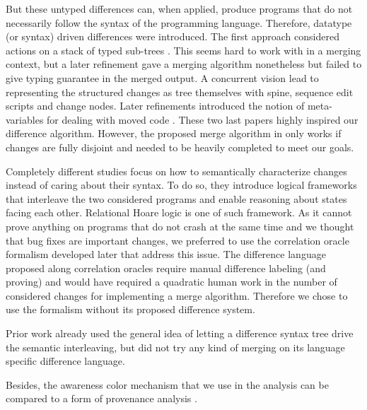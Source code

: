 \documentclass[a4paper,11pt]{article}
\newcommand\yrg[1]{}%
\newcommand\gb[1]{}%
\begin{document}
But these untyped differences can, when applied, produce programs that do not necessarily follow the syntax of the programming language. Therefore, datatype (or syntax) driven differences were introduced. The first approach considered actions on a stack of typed sub-trees \cite{lempsink2009type}. This seems hard to work with in a merging context, but a later refinement \cite{vassena2016generic} gave a merging algorithm nonetheless but failed to give typing guarantee in the merged output. A concurrent vision lead to representing the structured changes as tree themselves \cite{miraldo2017type} with spine, sequence edit scripts and change nodes. Later refinements introduced the notion of meta-variables for dealing with moved code \cite{miraldo2019efficient}. These two last papers highly inspired our difference algorithm. However, the proposed merge algorithm in \cite{miraldo2019efficient} only works if changes are fully disjoint and needed to be heavily completed to meet our goals.

Completely different studies focus on how to semantically characterize changes instead of caring about their syntax. To do so, they introduce logical frameworks that interleave the two considered programs and enable reasoning about states facing each other. Relational Hoare logic \cite{benton2004simple} is one of such framework. As it cannot prove anything on programs that do not crash at the same time and we thought that bug fixes are important changes, we preferred to use the correlation oracle formalism \cite{girka2017verifiable} developed later that address this issue. The difference language proposed along correlation oracles require manual difference labeling (and proving) and would have required a quadratic human work in the number of considered changes for implementing a merge algorithm. Therefore we chose to use the formalism without its proposed difference system.

Prior work \cite{girka2015mechanically} already used the general idea of letting a difference syntax tree drive the semantic interleaving, but did not try any kind of merging on its language specific difference language.

Besides, the awareness color mechanism that we use in the analysis can be compared to a form of provenance analysis \cite{cheney2007provenance}. 

\yrg{You should add a section about the implementation, or at the very least,
a reference to the tool's git repository with a clear description of what it
does.}\gb{I talk about it in Section~\ref{sec:codegen} now, I really have no space for a real implementation section}
\end{document}
